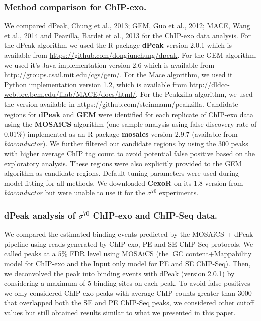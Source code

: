\documentclass{bmcart}\usepackage[]{graphicx}\usepackage[]{color}
\newcommand{\sig}{\sigma^{70}}
\begin{document}
\subsubsection*{Method comparison for ChIP-exo.}

We compared dPeak, Chung et al., 2013; GEM, Guo et al., 2012; MACE,
Wang et al., 2014 and Peazilla, Bardet et al., 2013 for the ChIP-exo
data analysis. For the dPeak algorithm we used the R package
\textbf{dPeak} version 2.0.1 which is available from
\url{https://github.com/dongjunchung/dpeak}. For the GEM algorithm, we
used it's Java implementation version 2.6 which is available from
\url{http://groups.csail.mit.edu/cgs/gem/}. For the Mace algorithm, we
used it Python implementation version 1.2, which is available from
\url{http://dldcc-web.brc.bcm.edu/lilab/MACE/docs/html/}. For the
Peakzilla algorithm, we used the version available in
\url{https://github.com/steinmann/peakzilla}. Candidate regions for
\textbf{dPeak} and \textbf{GEM} were identified for each replicate of
ChIP-exo data using the \textbf{MOSAiCS} algorithm \cite{mosaics} (one
sample analysis using false discovery rate of 0.01\%)
implemented as an R package \textbf{mosaics} version 2.9.7 (available
from \emph{bioconductor}). We further filtered out candidate regions
by using the 300 peaks with higher average ChIP tag count to
avoid potential false positive based on the exploratory
analysis. These regions were also explicitly provided to the GEM
algorithm as candidate regions. Default tuning parameters were used
during model fitting for all methods. We downloaded \textbf{CexoR}
\cite{cexor} on its 1.8 version from \emph{bioconductor} but were
unable to use it for the $\sig$ experiments.

\subsubsection*{dPeak analysis of $\sig$ ChIP-exo and ChIP-Seq data.}

We compared the estimated binding events predicted by the MOSAiCS +
dPeak pipeline using reads generated by ChIP-exo, PE and SE ChIP-Seq
protocols. We called peaks at a $5\%$ FDR level using MOSAiCS (the
$\mbox{GC content} + \mbox{Mappability}$ model for ChIP-exo and the
$\mbox{Input only}$ model for PE and SE ChIP-Seq). Then, we
deconvolved the peak into binding events with dPeak (version 2.0.1) by
considering a maximum of 5 binding sites on each peak. To avoid false
positives we only considered ChIP-exo peaks with average ChIP counts
greater than 3000 that overlapped both the SE and PE ChIP-Seq peaks,
we considered other cutoff values but still obtained results similar
to what we presented in this paper.
\end{document}
